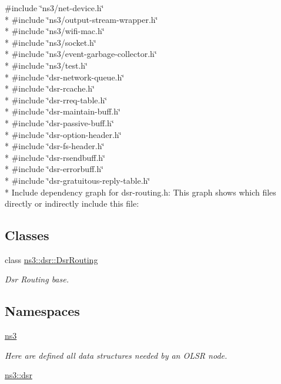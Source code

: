 {\ttfamily \#include \char`\"{}ns3/net-\/device.\+h\char`\"{}}\\*
{\ttfamily \#include \char`\"{}ns3/output-\/stream-\/wrapper.\+h\char`\"{}}\\*
{\ttfamily \#include \char`\"{}ns3/wifi-\/mac.\+h\char`\"{}}\\*
{\ttfamily \#include \char`\"{}ns3/socket.\+h\char`\"{}}\\*
{\ttfamily \#include \char`\"{}ns3/event-\/garbage-\/collector.\+h\char`\"{}}\\*
{\ttfamily \#include \char`\"{}ns3/test.\+h\char`\"{}}\\*
{\ttfamily \#include \char`\"{}dsr-\/network-\/queue.\+h\char`\"{}}\\*
{\ttfamily \#include \char`\"{}dsr-\/rcache.\+h\char`\"{}}\\*
{\ttfamily \#include \char`\"{}dsr-\/rreq-\/table.\+h\char`\"{}}\\*
{\ttfamily \#include \char`\"{}dsr-\/maintain-\/buff.\+h\char`\"{}}\\*
{\ttfamily \#include \char`\"{}dsr-\/passive-\/buff.\+h\char`\"{}}\\*
{\ttfamily \#include \char`\"{}dsr-\/option-\/header.\+h\char`\"{}}\\*
{\ttfamily \#include \char`\"{}dsr-\/fs-\/header.\+h\char`\"{}}\\*
{\ttfamily \#include \char`\"{}dsr-\/rsendbuff.\+h\char`\"{}}\\*
{\ttfamily \#include \char`\"{}dsr-\/errorbuff.\+h\char`\"{}}\\*
{\ttfamily \#include \char`\"{}dsr-\/gratuitous-\/reply-\/table.\+h\char`\"{}}\\*
Include dependency graph for dsr-\/routing.h\+:
This graph shows which files directly or indirectly include this file\+:
\subsection*{Classes}
\begin{DoxyCompactItemize}
\item 
class \hyperlink{classns3_1_1dsr_1_1DsrRouting}{ns3\+::dsr\+::\+Dsr\+Routing}
\begin{DoxyCompactList}\small\item\em Dsr Routing base. \end{DoxyCompactList}\end{DoxyCompactItemize}
\subsection*{Namespaces}
\begin{DoxyCompactItemize}
\item 
 \hyperlink{namespacens3}{ns3}
\begin{DoxyCompactList}\small\item\em Here are defined all data structures needed by an O\+L\+SR node. \end{DoxyCompactList}\item 
 \hyperlink{namespacens3_1_1dsr}{ns3\+::dsr}
\end{DoxyCompactItemize}

